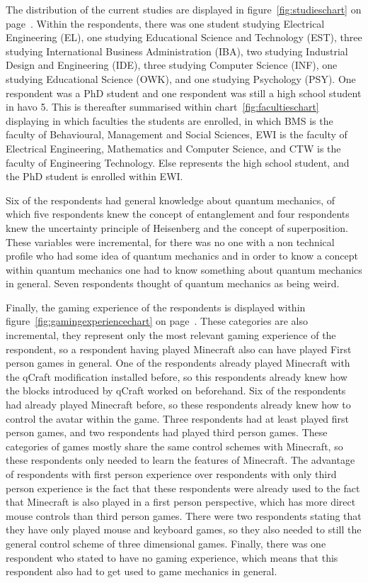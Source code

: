 \documentclass[11pt,twoside]{report} %
\begin{document}
The distribution of the current studies are displayed in figure~\ref{fig:studieschart} on page~\pageref{fig:studieschart}. Within the respondents, there was one student studying Electrical Engineering (EL), one studying Educational Science and Technology (EST), three studying International Business Administration (IBA), two studying Industrial Design and Engineering (IDE), three studying Computer Science (INF), one studying Educational Science (OWK), and one studying Psychology (PSY). One respondent was a PhD student and one respondent was still a high school student in havo 5. This is thereafter summarised within chart~\ref{fig:facultieschart} displaying in which faculties the students are enrolled, in which BMS is the faculty of Behavioural, Management and Social Sciences, EWI is the faculty of Electrical Engineering, Mathematics and Computer Science, and CTW is the faculty of Engineering Technology. Else represents the high school student, and the PhD student is enrolled within EWI.

Six of the respondents had general knowledge about quantum mechanics, of which five respondents knew the concept of entanglement and four respondents knew the uncertainty principle of Heisenberg and the concept of superposition. These variables were incremental, for there was no one with a non technical profile who had some idea of quantum mechanics and in order to know a concept within quantum mechanics one had to know something about quantum mechanics in general. Seven respondents thought of quantum mechanics as being weird.

Finally, the gaming experience of the respondents is displayed within figure~\ref{fig:gamingexperiencechart} on page~\pageref{fig:gamingexperiencechart}. These categories are also incremental, they represent only the most relevant gaming experience of the respondent, so a respondent having played Minecraft also can have played First person games in general. One of the respondents already played Minecraft with the qCraft modification installed before, so this respondents already knew how the blocks introduced by qCraft worked on beforehand. Six of the respondents had already played Minecraft before, so these respondents already knew how to control the avatar within the game. Three respondents had at least played first person games, and two respondents had played third person games. These categories of games mostly share the same control schemes with Minecraft, so these respondents only needed to learn the features of Minecraft. The advantage of respondents with first person experience over respondents with only third person experience is the fact that these respondents were already used to the fact that Minecraft is also played in a first person perspective, which has more direct mouse controls than third person games. There were two respondents stating that they have only played mouse and keyboard games, so they also needed to still the general control scheme of three dimensional games. Finally, there was one respondent who stated to have no gaming experience, which means that this respondent also had to get used to game mechanics in general.
\end{document}

